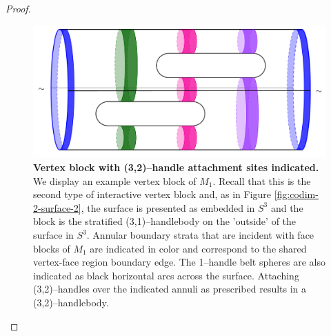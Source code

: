 \begin{proof}
		\begin{figure}[h!]
			\centering
			\includegraphics[width=\textwidth]{figures/vertex-block-incidence.png}
			\caption{
				\textbf{Vertex block with (3,2)--handle attachment sites indicated.}
				We display an example vertex block of $M_1$.
				Recall that this is the second type of interactive vertex block and, as in Figure \ref{fig:codim-2-surface-2}, the surface is presented as embedded in $S^3$ and the block is the stratified (3,1)--handlebody on the 'outside' of the surface in $S^3$.
				Annular boundary strata that are incident with face blocks of $M_1$ are indicated in color and correspond to the shared vertex-face region boundary edge.
				The 1--handle belt spheres are also indicated as black horizontal arcs across the surface.
				Attaching (3,2)--handles over the indicated annuli as prescribed results in a (3,2)--handlebody.
			}
			\label{fig:vertex-block-incidence}
		\end{figure}

%	
	
	


\end{proof}
